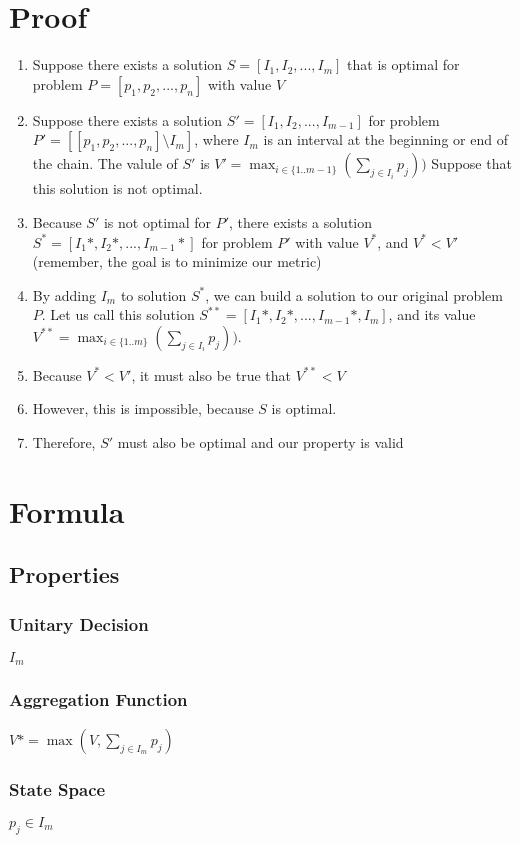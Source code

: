 \documentclass{article}
\begin{document}
\section{Proof}
\begin{enumerate}
	\item Suppose there exists a solution 
	$S = [I_1, I_2, ..., I_m]$ that is optimal for problem 
	$P = [p_1, p_2, ..., p_n]$ with value $V$
	\item Suppose there exists a solution $S' = [I_1, I_2, ..., I_{m-1}]$ for
	problem $P'= [[p_1, p_2, ..., p_n] \setminus I_m]$, where $I_m$ is an
	interval at the beginning or end of the chain. The valule of $S'$ is
	$V' = \max_{i\in\{1..m-1\}}(\sum_{j \in{I_i}} p_j))$ 
	Suppose that this solution is not optimal.
	\item Because $S'$ is not optimal for $P'$, there exists a solution $S^* =
	[I_1*, I_2*, ..., I_{m-1}*]$ for problem $P'$ with value $V^*$, and $V^* <
	V'$ \\(remember, the goal is to minimize our metric) 

	\item By adding $I_m$ to solution $S^*$, we can build a solution to our
	original problem $P$. Let us call this solution $S^{**} = [I_1*, I_2*, ...,
	I_{m-1}*, I_m]$, and its value $V^{**} = \max_{i\in\{1..m\}}(\sum_{j
	\in{I_i}} p_j))$.

	\item Because $V^{*} < V'$, it must also be true that $V^{**} < V$

	\item However, this is impossible, because $S$ is optimal. 
	\item Therefore, $S'$ must also be optimal and our property is valid
\end{enumerate}

\section{Formula}
\subsection{Properties}
\subsubsection{Unitary Decision}
$I_m$

\subsubsection{Aggregation Function}
$V* = \max(V, \sum_{j\in{I_m}}p_j)$

\subsubsection{State Space}
$p_j \in I_m$
\end{document}
